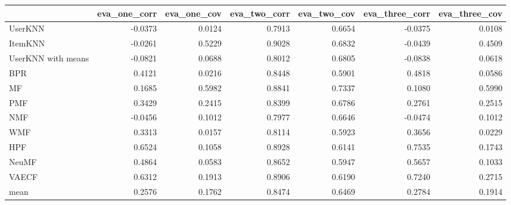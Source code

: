 \begin{tabular}{lrrrrrr}
\toprule
{} &  eva\_one\_corr &  eva\_one\_cov &  eva\_two\_corr &  eva\_two\_cov &  eva\_three\_corr &  eva\_three\_cov \\
\midrule
UserKNN            &       -0.0373 &       0.0124 &        0.7913 &       0.6654 &         -0.0375 &         0.0108 \\
ItemKNN            &       -0.0261 &       0.5229 &        0.9028 &       0.6832 &         -0.0439 &         0.4509 \\
UserKNN with means &       -0.0821 &       0.0688 &        0.8012 &       0.6805 &         -0.0838 &         0.0618 \\
BPR                &        0.4121 &       0.0216 &        0.8448 &       0.5901 &          0.4818 &         0.0586 \\
MF                 &        0.1685 &       0.5982 &        0.8841 &       0.7337 &          0.1080 &         0.5990 \\
PMF                &        0.3429 &       0.2415 &        0.8399 &       0.6786 &          0.2761 &         0.2515 \\
NMF                &       -0.0456 &       0.1012 &        0.7977 &       0.6646 &         -0.0474 &         0.1012 \\
WMF                &        0.3313 &       0.0157 &        0.8114 &       0.5923 &          0.3656 &         0.0229 \\
HPF                &        0.6524 &       0.1058 &        0.8928 &       0.6141 &          0.7535 &         0.1743 \\
NeuMF              &        0.4864 &       0.0583 &        0.8652 &       0.5947 &          0.5657 &         0.1033 \\
VAECF              &        0.6312 &       0.1913 &        0.8906 &       0.6190 &          0.7240 &         0.2715 \\
mean               &        0.2576 &       0.1762 &        0.8474 &       0.6469 &          0.2784 &         0.1914 \\
\bottomrule
\end{tabular}
